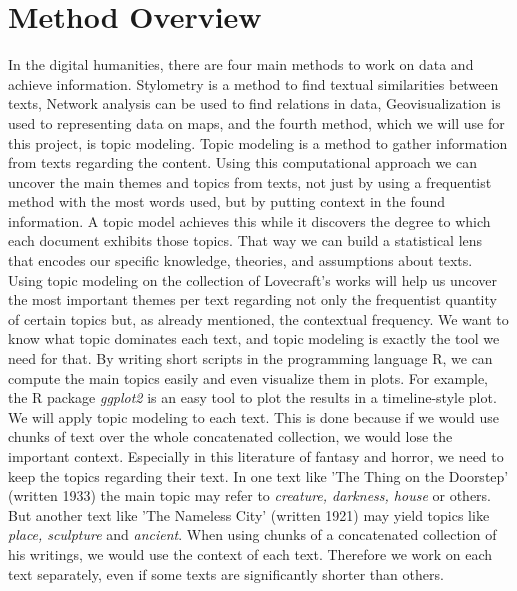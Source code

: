 \section{Method Overview}

In the digital humanities, there are four main methods to work on data and achieve information. 
Stylometry is a method to find textual similarities between texts, Network analysis can be used 
to find relations in data, Geovisualization is used to representing data on maps, and the fourth 
method, which we will use for this project, is topic modeling. Topic modeling is a method to 
gather information from texts regarding the content. Using this computational approach we can 
uncover the main themes and topics from texts, not just by using a frequentist method with the 
most words used, but by putting context in the found information. A topic model achieves this 
while it discovers the degree to which each document exhibits those topics. That way we can 
build a statistical lens that encodes our specific knowledge, theories, and assumptions about 
texts.\\

Using topic modeling on the collection of Lovecraft's works will help us uncover the most 
important themes per text regarding not only the frequentist quantity of certain topics but, 
as already mentioned, the contextual frequency. We want to know what topic dominates each text, 
and topic modeling is exactly the tool we need for that. By writing short scripts in the 
programming language R, we can compute the main topics easily and even visualize them in plots. 
For example, the R package \textit{ggplot2} is an easy tool to plot the results in a timeline-style plot. \\

We will apply topic modeling to each text. This is done because if we would use chunks of text 
over the whole concatenated collection, we would lose the important context. Especially in this 
literature of fantasy and horror, we need to keep the topics regarding their text. In one text 
like 'The Thing on the Doorstep' (written 1933) the main topic may refer to \textit{creature,
darkness, house} or others. But another text like 'The Nameless City' (written 1921) may 
yield topics like \textit{place, sculpture} and \textit{ancient}. When using chunks of a concatenated 
collection of his writings, we would use the context of each text. Therefore we work on each 
text separately, even if some texts are significantly shorter than others.\\

